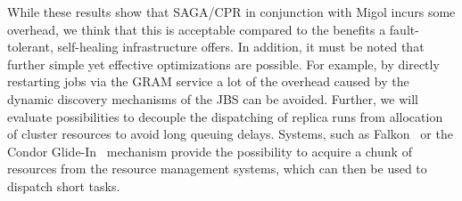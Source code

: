 \documentclass[conference,final]{IEEEtran}
\newcommand{\jhanote}[1]{ {\textcolor{red} { ***SJ: #1 }}}
\newcommand{\jhanote}[1]{}
\begin{document}

While these results show that SAGA/CPR in conjunction with Migol
incurs some overhead, we think that this is acceptable compared to the
benefits a fault-tolerant, self-healing infrastructure offers. In
addition, it must be noted that further simple yet effective
optimizations are possible. For example, by directly restarting jobs
via the GRAM service a lot of the overhead caused by the dynamic
discovery mechanisms of the JBS can
be avoided. Further, we will evaluate possibilities to decouple
the dispatching of replica runs from allocation of cluster resources 
to avoid long queuing delays. Systems, 
such as Falkon~\cite{1362680} or the Condor Glide-In~\cite{citeulike:291860} 
mechanism provide the possibility to acquire a chunk of resources 
from the resource management systems, which can
then be used to dispatch short tasks.


\end{document}
